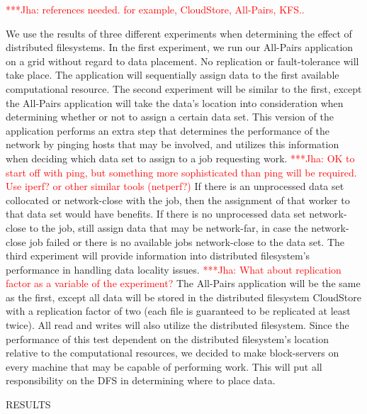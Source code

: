 \documentclass[a4paper,11pt]{article}
\newcommand{\jhanote}[1]{ {\textcolor{red} { ***Jha: #1 }}}
\newcommand{\jhanote}[1]{}
\begin{document}
\jhanote{references needed. for example, CloudStore, All-Pairs, KFS.. }

We use the results of three different experiments when determining the effect of distributed filesystems.  In the first experiment, we run our All-Pairs application on a grid without regard to data placement.  No replication or fault-tolerance will take place. The application will sequentially assign data to the first available computational resource. The second experiment will be similar to the first, except the All-Pairs application will take the data's location into consideration when determining whether or not to assign a certain data set. This version of the application performs an extra step that determines the performance of the network by pinging hosts that may be involved, and utilizes this information when deciding which data set to assign to a job requesting work.  \jhanote{OK to start off with ping, but something more sophisticated than ping will be required. Use iperf? or other similar tools (netperf?)}  If there is an unprocessed data set collocated or network-close with the job, then the assignment of that worker to that data set would have benefits.  If there is no unprocessed data set network-close to the job, still assign data that may be network-far, in case the network-close job failed or there is no available jobs network-close to the data set. The third experiment will provide information into distributed filesystem's performance in handling data locality issues.  \jhanote{What about replication factor as a variable of the experiment?}  The All-Pairs application will be the same as the first, except all data will be stored in the distributed filesystem CloudStore with a replication factor of two (each file is guaranteed to be replicated at least twice).  All read and writes will also utilize the distributed filesystem.  Since the performance of this test dependent on the distributed filesystem's location relative to the computational resources, we decided to make block-servers on every machine that may be capable of performing work.  This will put all responsibility on the DFS in determining where to place data.

RESULTS
\end{document}
